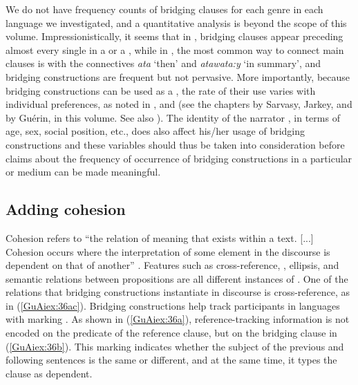\documentclass[output=paper]{LSP/langsci}
\begin{document}
We do not have frequency counts of bridging clauses for each genre in each language we investigated, and a quantitative analysis is beyond the scope of this volume. Impressionistically, it seems that in , bridging clauses appear preceding almost every single  in a  or a  \citep{Pennington2015}, while in  \citep[][544--545]{aikhenvald2008}, the most common way to connect main clauses is with the connectives \textit{ata} `then' and \textit{atawata:y} `in summary', and bridging constructions are frequent but not pervasive. More importantly, because bridging constructions can be used as a , the rate of their use varies with individual preferences, as noted in ,  and  (see the chapters by Sarvasy, Jarkey, and by Guérin, in this volume. See also \citealt[][375]{devries.2005}). The identity of the narrator \citep[][17--20]{longacre83}, in terms of age, sex, social position, etc., does also affect his/her usage of bridging constructions and these variables should thus be taken into consideration before claims about the frequency of occurrence of bridging constructions in a particular  or medium can be made meaningful. 

\subsection{Adding cohesion} 
\label{GuAi42cohesion}
Cohesion refers to ``the relation of meaning that exists within a text. [...] Cohesion occurs where the interpretation of some element in the discourse is dependent on that of another'' \citep[][4]{hasan76}. Features such as cross-reference, , ellipsis, and semantic relations between propositions are all different instances of . One of the  relations that bridging constructions instantiate in discourse is cross-reference, as in (\ref{GuAiex:36ac}). Bridging constructions help track participants in languages with  marking \citep[][373--378]{devries.2005}. As shown in (\ref{GuAiex:36a}), reference-tracking information is not encoded on the  predicate of the reference clause, but on the bridging clause in (\ref{GuAiex:36b}). This marking indicates whether the subject of the previous and following sentences is the same or different, and at the same time, it types the clause as dependent. 
\end{document}
